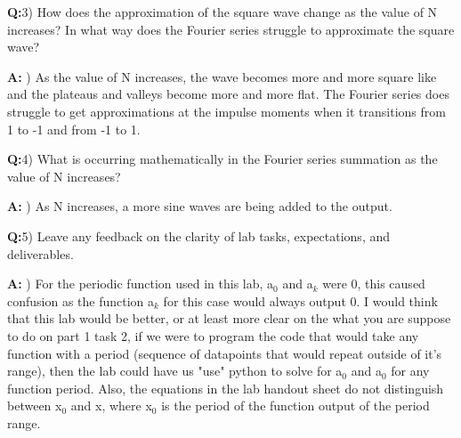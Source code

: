 \documentclass[12pt,a4paper]{article}
\newcommand{\Q}{\leavevmode\par\textbf {Q:}}
\newcommand{\A}{\par\textbf{A:} \normalfont}
\begin{document}
\Q 3) How does the approximation of the square wave change as the value of N increases? In what way does the Fourier series struggle to approximate the square wave?
\A 3) As the value of N increases, the wave becomes more and more square like and the plateaus and valleys become more and more flat. The Fourier series does struggle to get approximations at the impulse moments when it transitions from 1 to -1 and from -1 to 1.

\Q 4) What is occurring mathematically in the Fourier series summation as the value of N increases?
\A 4) As N increases, a more sine waves are being added to the output.

\Q 5) Leave any feedback on the clarity of lab tasks, expectations, and deliverables.
\A 5) For the periodic function used in this lab, a$_0$ and a$_k$ were 0, this caused confusion as the function a$_k$ for this case would always output 0. I would think that this lab would be better, or at least more clear on the what you are suppose to do on part 1 task 2, if we were to program the code that would take any function with a period (sequence of datapoints that would repeat outside of it's range), then the lab could have us "use" python to solve for a$_0$ and a$_0$ for any function period.
Also, the equations in the lab handout sheet do not distinguish between x$_0$ and x, where x$_0$ is the period of the function output of the period range.







\end{document}
